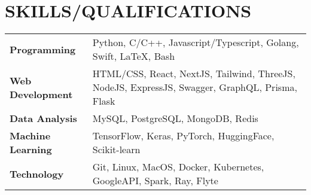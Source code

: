 \section{SKILLS/QUALIFICATIONS}

\small{
  \begin{tabularx}{\linewidth}{@{} p{3.5cm} X @{}}
    \textbf{Programming} & Python, C/C++, Javascript/Typescript, Golang, Swift, LaTeX, Bash \\
    \textbf{Web Development} & HTML/CSS, React, NextJS, Tailwind, ThreeJS, NodeJS, ExpressJS, Swagger, GraphQL, Prisma, Flask \\
    \textbf{Data Analysis} & MySQL, PostgreSQL, MongoDB, Redis \\
    \textbf{Machine Learning} & TensorFlow, Keras, PyTorch, HuggingFace, Scikit-learn \\
    \textbf{Technology} & Git, Linux, MacOS, Docker, Kubernetes, GoogleAPI, Spark, Ray, Flyte \\
  \end{tabularx}
}